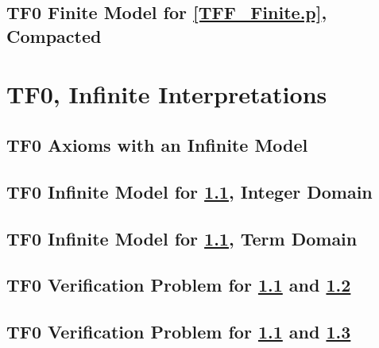 \documentclass{easychair}
\begin{document}
\newpage
\subsection{TF0 Finite Model for \ref{TFF_Finite.p}, Compacted}
\label{TFF_Finite_Compact.s}
\begin{small}

\end{small}

\newpage
\section{TF0, Infinite Interpretations}
\label{TF0Infinite}

\subsection{TF0 Axioms with an Infinite Model}
\label{TFF_Infinite.p}
\begin{small}

\end{small}

\newpage
\subsection{TF0 Infinite Model for \ref{TFF_Infinite.p}, Integer Domain}
\label{TFF_Integer.s}
\begin{small}

\end{small}

\newpage
\subsection{TF0 Infinite Model for \ref{TFF_Infinite.p}, Term Domain}
\label{TFF_Peano.s}
\begin{small}

\end{small}

\newpage
\subsection{TF0 Verification Problem for \ref{TFF_Infinite.p} and \ref{TFF_Integer.s}}
\label{TFF_Integer.s.p}
\begin{small}

\end{small}

\newpage
\subsection{TF0 Verification Problem for \ref{TFF_Infinite.p} and \ref{TFF_Peano.s}}
\label{TFF_Peano.s.p}
\begin{small}

\end{small}
\end{document}
